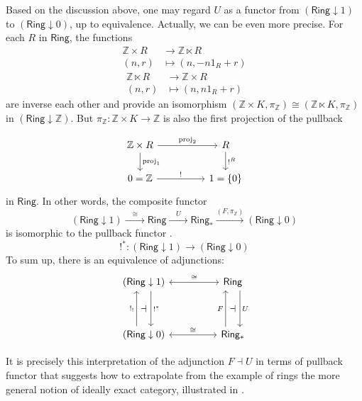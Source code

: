 Based on the discussion above, one may regard $U$ as a functor from $(\mathsf{Ring} \downarrow 1)$ to $(\mathsf{Ring} \downarrow 0)$, up to equivalence. Actually, we can be even more precise.
For each $R$ in $\mathsf{Ring}$, the functions
\begin{align*}
\mathbb{Z} \times R &\to \mathbb{Z} \ltimes R \\
(n,r) &\mapsto (n, -n1_R + r)
\end{align*}
\begin{align*}
\mathbb{Z} \ltimes R &\to \mathbb{Z} \times R \\
(n,r) &\mapsto (n, n1_R + r)
\end{align*}
are inverse each other and provide an isomorphism $(\mathbb{Z} \times K, \pi_\mathbb{Z}) \cong (\mathbb{Z} \ltimes K, \pi_\mathbb{Z})$ in $(\mathsf{Ring} \downarrow \mathbb{Z})$. But $\pi_\mathbb{Z}: \mathbb{Z} \times K \to \mathbb{Z}$ is also the first projection of the pullback

\[
\begin{tikzcd}
\mathbb{Z} \times R \arrow[rr, "\mathrm{proj}_2"] \arrow[d, "\mathrm{proj}_1"] &  & R \arrow[d, "!^R"] \\
0 = \mathbb{Z} \arrow[rr, "!"]                                                      &  & 1 = \{0\}                
\end{tikzcd}
\]
in $\mathsf{Ring}$. In other words, the composite functor
\[
(\mathsf{Ring} \downarrow 1) \xrightarrow{\quad\cong\quad} \mathsf{Ring} \xrightarrow{\quad U\quad} \mathsf{Ring_*} \xrightarrow{(F,\pi_\mathbb{Z})} (\mathsf{Ring} \downarrow 0)
\]
is isomorphic to the pullback functor .
\[
!^* : (\mathsf{Ring} \downarrow 1) \to (\mathsf{Ring} \downarrow 0)
\]
To sum up, there is an equivalence of adjunctions:
\[
\begin{tikzcd}
(\mathsf{Ring} \downarrow 1) \arrow[dd, "!^*", shift left=3] \arrow[rr, leftrightarrow, "\cong"] \arrow[dd, phantom, "\dashv" description]                       &  & \mathsf{Ring} \arrow[dd, "U", shift left=3] \arrow[dd, phantom, "\dashv" description]      \\
                                                                                                      &  &                                             \\
 (\mathsf{Ring} \downarrow 0) \arrow[uu, "!_!", shift left=3] \arrow[rr, "\cong", leftrightarrow] &  & \mathsf{Ring_*} \arrow[uu, "F", shift left=3]
\end{tikzcd}
\]

It is precisely this interpretation of the adjunction $F \dashv U$ in terms of
pullback functor that suggests how to extrapolate from the example of rings
the more general notion of ideally exact category, illustrated in .